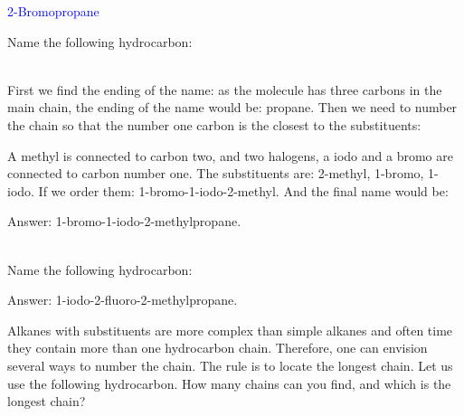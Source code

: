 \documentclass[main.tex]{subfiles}
\newcommand{\mytriangleright}[1]{\tikz{\filldraw[draw=#1,fill=#1] (0,0) --(0em,0.6em) -- (0.4em,0.3em);}}
\begin{document}
\begin{description}
\begin{center}  \hspace{0.5cm}\textcolor{blue}{2-Bromopropane}\end{center}




\begin{example} %
Name the following hydrocarbon:
\begin{center} \end{center}
\\
First we find the ending of the name: as the molecule has three carbons in the main chain, the ending of the name would be: propane. Then we need to number the chain so that the number one carbon is the closest to the substituents:
\begin{center} \end{center}
A methyl is connected to carbon two, and two halogens, a iodo and a bromo are connected to carbon number one. The substituents are: 2-methyl, 1-bromo, 1-iodo. If we order them: 1-bromo-1-iodo-2-methyl. And the final name would be: 
\begin{flushright} \mytriangleright{dgreen}\small Answer: 1-bromo-1-iodo-2-methylpropane. \end{flushright}
\faDiamond\ \\
Name the following hydrocarbon:
\begin{center} \end{center}\begin{flushright} \mytriangleright{dgreen}\small Answer: 1-iodo-2-fluoro-2-methylpropane. \end{flushright}
\end{example}%




\item[\docfilehook{  Finding the longest chain}{Finding the longest the chain}] Alkanes with substituents are more complex than simple alkanes and often time they contain more than one hydrocarbon chain. Therefore, one can envision several ways to number the chain. The rule is to locate the longest chain. Let us use the following hydrocarbon. How many chains can you find, and which is the longest chain?


\end{description}
\end{document}
